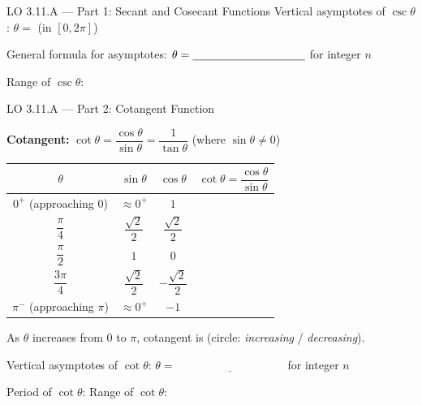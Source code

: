 \documentclass[10pt]{article}
\begin{document}
\begin{notesbox}{LO 3.11.A --- Part 1: Secant and Cosecant Functions}
\vspace{6pt}
Vertical asymptotes of $\csc\theta$: $\theta = $ \underline{\hspace{4cm}} (in $[0,2\pi]$)

\vspace{4pt}
General formula for asymptotes: $\theta = \underline{\hspace{3.5cm}}$ for integer $n$

\vspace{4pt}
Range of $\csc\theta$: \underline{\hspace{5cm}}

\end{notesbox}

\vspace{0.08in}

\begin{notesbox}{LO 3.11.A --- Part 2: Cotangent Function}

\textbf{Cotangent:}
$\cot\theta = \dfrac{\cos\theta}{\sin\theta} = \dfrac{1}{\tan\theta}$
\quad (where $\sin\theta \neq 0$)

\vspace{6pt}
\renewcommand{\arraystretch}{1.7}
\begin{tabular}{|c|c|c|c|}
\hline
$\theta$ & $\sin\theta$ & $\cos\theta$ & $\cot\theta = \dfrac{\cos\theta}{\sin\theta}$ \\
\hline
$0^+$ (approaching 0) & $\approx 0^+$ & $1$ & \\
\hline
$\dfrac{\pi}{4}$ & $\dfrac{\sqrt{2}}{2}$ & $\dfrac{\sqrt{2}}{2}$ & \\
\hline
$\dfrac{\pi}{2}$ & $1$ & $0$ & \\
\hline
$\dfrac{3\pi}{4}$ & $\dfrac{\sqrt{2}}{2}$ & $-\dfrac{\sqrt{2}}{2}$ & \\
\hline
$\pi^-$ (approaching $\pi$) & $\approx 0^+$ & $-1$ & \\
\hline
\end{tabular}

\vspace{6pt}
As $\theta$ increases from $0$ to $\pi$, cotangent is \underline{\hspace{3cm}}
(circle: \textit{increasing} / \textit{decreasing}).

\vspace{4pt}
Vertical asymptotes of $\cot\theta$: $\theta = \underline{\hspace{4cm}}$ for integer $n$

\vspace{4pt}
Period of $\cot\theta$: \underline{\hspace{2.5cm}}
\hspace{1.5cm}
Range of $\cot\theta$: \underline{\hspace{4.5cm}}

\end{notesbox}
\end{document}
